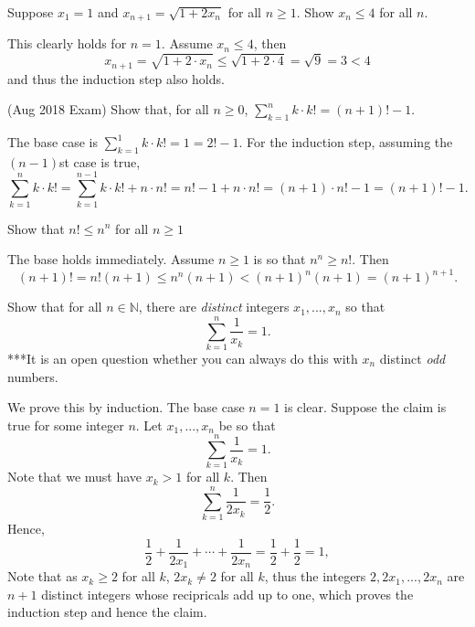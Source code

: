 \documentclass[11pt,dvipsnames]{book}
\numberwithin{equation}{section} %
\numberwithin{figure}{section} %
\numberwithin{table}{section} %
\begin{document}
\begin{exercise}
Suppose $x_{1}=1$ and $x_{n+1} = \sqrt{1+2x_{n}}$ for all $n\geq 1$. Show $x_{n}\leq 4$ for all $n$. \\
\end{exercise}


\begin{solution}
This clearly holds for $n=1$. Assume $x_{n}\leq 4$, then 
\[
x_{n+1}= \sqrt{1+2\cdot x_{n}}\leq \sqrt{1+2\cdot 4}=\sqrt{9}=3<4\]
and thus the induction step also holds. 
\end{solution}







\begin{exercise}  (Aug 2018 Exam) Show that, for all $n\geq 0$, $\sum_{k=1}^{n} k\cdot k! = (n+1)!-1$. 
\end{exercise}
\begin{solution}
The base case is $\sum_{k=1}^{1} k\cdot k!=1=2!-1$. For the induction step, assuming the $(n-1)$st case is true,
\[
\sum_{k=1}^{n} k\cdot k! 
=\sum_{k=1}^{n-1} k\cdot k! + n\cdot n!
=n!-1+ n\cdot n!
=(n+1)\cdot n! -1 = (n+1)!-1.
\]
\end{solution}


\begin{exercise} Show that $n!\leq n^{n}$ for all $n\geq 1$
\end{exercise}

\begin{solution}
The base holds immediately. Assume $n\geq 1$ is so that $n^{n}\geq n!$. Then
\[
(n+1)!=n! (n+1)\leq n^{n} (n+1)<(n+1)^{n}(n+1)=(n+1)^{n+1}.
\]
\end{solution}



\begin{exercise} Show that for all $n\in\mathbb{N}$, there are {\it distinct} integers $x_{1},...,x_{n}$ so that 
\[
\sum_{k=1}^{n} \frac{1}{x_{k}}=1.
\]
***It is an open question whether you can always do this with $x_{n}$ distinct {\it odd} numbers.

\end{exercise}


\begin{solution}
We prove this by induction. The base case $n=1$ is clear. Suppose the claim is true for some integer $n$. Let $x_{1},...,x_{n}$ be so that 
\[
\sum_{k=1}^{n} \frac{1}{x_{k}}=1.
\]
Note that we must have $x_{k}>1$ for all $k$. Then 
\[
\sum_{k=1}^{n} \frac{1}{2x_{k}}=\frac{1}{2}.
\]
Hence,
\[
\frac{1}{2} + \frac{1}{2x_{1}}+\cdots + \frac{1}{2x_{n}}=\frac{1}{2}+\frac{1}{2} =1,
\]
Note that as $x_{k}\geq 2$ for all $k$, $2x_{k}\neq 2$ for all $k$, thus the integers $2,2x_{1},...,2x_{n}$ are $n+1$ distinct integers whose recipricals add up to one, which proves the induction step and hence the claim. 

\end{solution}
\end{document}
